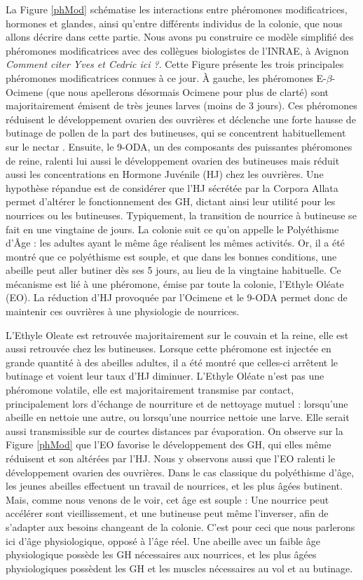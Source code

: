 			La Figure \ref{phMod} schématise les interactions entre phéromones modificatrices, hormones et glandes, ainsi qu'entre différents individus de la colonie, que nous allons décrire dans cette partie. Nous avons pu construire ce modèle simplifié des phéromones modificatrices avec des collègues  biologistes de l'INRAE, à Avignon \textit{Comment citer Yves et Cedric ici ?}. Cette Figure présente les trois principales phéromones modificatrices connues à ce jour. À gauche, les phéromones E-$\beta$-Ocimene (que nous apellerons désormais Ocimene pour plus de clarté) sont majoritairement émisent de très jeunes larves (moins de 3 jours). Ces phéromones réduisent le développement ovarien des ouvrières et déclenche une forte hausse de butinage de pollen de la part des butineuses, qui se concentrent habituellement sur le nectar \cite{maisonnasse_e-b-ocimene_2010}. Ensuite, le 9-ODA, un des composants des puissantes phéromones de reine, ralenti lui aussi le développement ovarien des butineuses mais réduit aussi les concentrations en Hormone Juvénile (HJ) chez les ouvrières. Une hypothèse répandue est de considérer que l'HJ sécrétée par la Corpora Allata permet d'altérer le fonctionnement des GH, dictant ainsi leur utilité pour les nourrices ou les butineuses. Typiquement, la transition de nourrice à butineuse se fait en une vingtaine de jours. La colonie suit ce qu'on appelle le Polyéthisme d'Âge : les adultes ayant le même âge réalisent les mêmes activités. Or, il a été montré que ce polyéthisme est souple, et que dans les bonnes conditions, une abeille peut aller butiner dès ses 5 jours, au lieu de la vingtaine habituelle. Ce mécanisme est lié à une phéromone, émise par toute la colonie, l'Ethyle Oléate (EO). La réduction d'HJ provoquée par l'Ocimene et le 9-ODA permet donc de maintenir ces ouvrières à une physiologie de nourrices.
			
			 L'Ethyle Oleate est retrouvée majoritairement sur le couvain et la reine, elle est aussi retrouvée chez les butineuses. Lorsque cette phéromone est injectée en grande quantité à des abeilles adultes, il a été montré que celles-ci arrêtent le butinage et voient leur taux d'HJ diminuer. L'Ethyle Oléate n'est pas une phéromone volatile, elle est majoritairement transmise par contact, principalement lors d'échange de nourriture et de nettoyage mutuel : lorsqu'une abeille en nettoie une autre, ou lorsqu'une nourrice nettoie une larve. Elle serait aussi transmissible sur de courtes distances par évaporation. On observe sur la Figure \ref{phMod} que l'EO favorise le développement des GH, qui elles même réduisent et son altérées par l'HJ. Nous y observons aussi que l'EO ralenti le développement ovarien des ouvrières. Dans le cas classique du polyéthisme d'âge, les jeunes abeilles effectuent un travail de nourrices, et les plus âgées butinent. Mais, comme nous venons de le voir, cet âge est souple : Une nourrice peut accélérer sont vieillissement, et une butineuse peut même l'inverser, afin de s'adapter aux besoins changeant de la colonie. C'est pour ceci que nous parlerons ici d'âge physiologique, opposé à l'âge réel. Une abeille avec un faible âge physiologique possède les GH nécessaires aux nourrices, et les plus âgées physiologiques possèdent les GH et les muscles nécessaires au vol et au butinage. 
			
